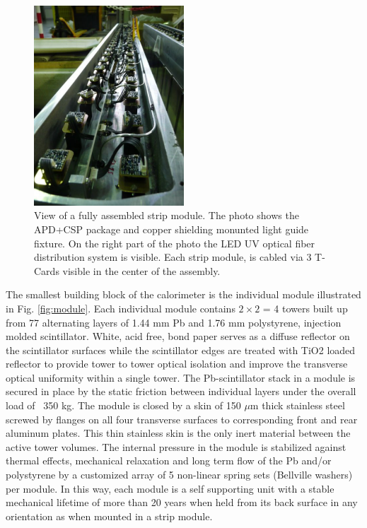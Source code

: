 \begin{figure}[ht]
\begin{center}
\includegraphics[width=0.5\textwidth]{figures/strip-module.pdf}
\end{center}
\caption{\label{fig:strip} View of a fully assembled strip module. The photo shows the APD+CSP package and copper shielding monunted light guide fixture. On the right part
of the photo the LED UV optical fiber distribution system is visible. Each strip module, is cabled via 3 T-Cards visible in the center of the assembly.}
\end{figure}

The smallest building block of the calorimeter is the individual module illustrated in Fig. \ref{fig:module}.
Each individual module contains $2\times 2$ = 4 towers built up from 77 alternating layers of 1.44 mm Pb and 1.76 mm polystyrene, 
injection molded scintillator. White, acid free, bond paper serves as a diffuse reflector on the scintillator 
surfaces while the scintillator edges are treated with TiO2 loaded reflector to provide tower to tower optical 
isolation and improve the transverse optical uniformity within a single tower. 
The Pb-scintillator stack in a module is secured in place by the static friction between individual 
layers under the overall  load of ~350 kg. The module is closed by a skin of 150 $\mu$m thick stainless 
steel screwed by flanges on all four transverse surfaces to corresponding front and rear aluminum  plates. 
This thin stainless skin is the only inert material between the active tower volumes. 
The internal pressure in the module is stabilized against thermal effects, 
mechanical relaxation and long term flow of the Pb and/or polystyrene by a customized 
array of 5 non-linear spring sets (Bellville washers) per module. 
In this way, each module is a self supporting unit with a stable mechanical lifetime of 
more than 20 years when held from its back surface in any orientation as when mounted in a strip module.

